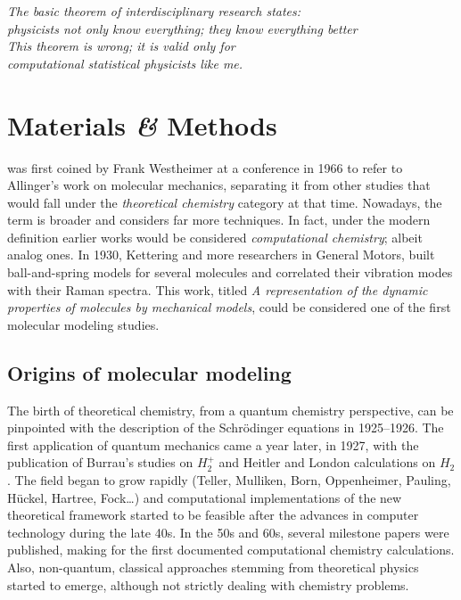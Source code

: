 
\begin{savequote}[85mm]
	\itshape The basic theorem of interdisciplinary research states: \\
	\itshape physicists not only know everything; they know everything better \\
	\itshape This theorem is wrong; it is valid only for \\
	\itshape computational statistical physicists like me.\cite{Stauffer_2004}
\end{savequote}

\chapter{Materials \textit{\&} Methods}
\label{chap:02}

 was first coined by Frank Westheimer at a conference in 1966 to refer to Allinger's work on molecular mechanics,\cite{Lipkowitz_2000} separating it from other studies that would fall under the \textit{theoretical chemistry} category at that time. Nowadays, the term is broader and considers far more techniques. In fact, under the modern definition earlier works would be considered \textit{computational chemistry}; albeit analog ones. In 1930, Kettering and more researchers in General Motors, built ball-and-spring models for several molecules and correlated their vibration modes with their Raman spectra. This work, titled \textit{A representation of the dynamic properties of molecules by mechanical models},\cite{kettering1930} could be considered one of the first molecular modeling studies.

\section{Origins of molecular modeling}
The birth of theoretical chemistry, from a quantum chemistry perspective, can be pinpointed with the description of the Schrödinger equations in 1925--1926.\cite{schrodinger} The first application of quantum mechanics came a year later, in 1927, with the publication of Burrau's studies\cite{burrau1927} on $H_{2}^{+}$ and Heitler and London calculations\cite{heitlerlondon} on $H_{2}$. The field began to grow rapidly (Teller,\cite{teller1930hydrogen} Mulliken,\cite{mulliken} Born,\cite{born} Oppenheimer,\cite{Oppenheimer} Pauling,\cite{pauling} Hückel,\cite{huckel} Hartree,\cite{hartree} Fock\cite{fock}\ldots) and computational implementations of the new theoretical framework started to be feasible after the advances in computer technology during the late 40s.\cite{chistory1940} In the 50s and 60s, several milestone papers were published, making for the first documented computational chemistry calculations.\cite{bolcer2007,ccl} Also, non-quantum, classical approaches stemming from theoretical physics started to emerge, although not strictly dealing with chemistry problems.\cite{Alder1959,Gibson1960,Rahman1964}

